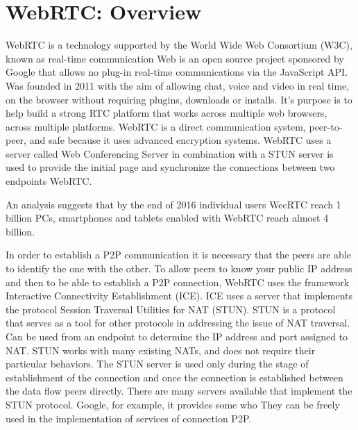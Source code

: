 \section{WebRTC: Overview}
\label{sec:WebRTC: Overview}
WebRTC is a technology supported by the World Wide Web Consortium (W3C), known as real-time communication Web is an open source project sponsored by Google that allows no plug-in real-time communications via the JavaScript API. Was founded in 2011 with the aim of allowing chat, voice and video in real time, on the browser without requiring plugins, downloads or installs.
It’s purpose is to help build a strong RTC platform that works across multiple web browsers, across multiple platforms.\cite{webrtc}
WebRTC is a direct communication system, peer-to-peer, and safe because it uses advanced encryption systems.
WebRTC uses a server called Web Conferencing Server in combination with a STUN server is used to provide the initial page and synchronize the connections between two endpoints WebRTC.

An analysis suggests that by the end of 2016 individual users WecRTC reach 1 billion PCs, smartphones and tablets enabled with WebRTC reach almost 4 billion.

In order to establish a P2P communication it is necessary that the peers are able to identify the one with the other.
To allow peers to know your public IP address and then to be able to establish a P2P connection, WebRTC uses the framework Interactive Connectivity Establishment (ICE).\cite{webrtc2}
ICE uses a server that implements the protocol Session Traversal
Utilities for NAT (STUN). STUN is a protocol that serves as a tool for other
protocols in addressing the issue of NAT traversal. Can be used
from an endpoint to determine the IP address and port assigned to
NAT. STUN works with many existing NATs, and does not require
their particular behaviors.\cite{webrtc1}
The STUN server is used only during the stage of establishment of the connection
and once the connection is established between the data flow
peers directly. There are many servers available that implement
the STUN protocol. Google, for example, it provides some who
They can be freely used in the implementation of services of connection
P2P.